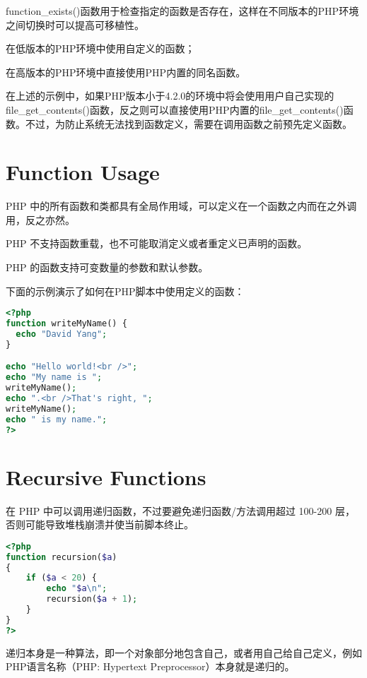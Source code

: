 function\_exists()函数用于检查指定的函数是否存在，这样在不同版本的PHP环境之间切换时可以提高可移植性。

\begin{compactitem}
\item 在低版本的PHP环境中使用自定义的函数；
\item 在高版本的PHP环境中直接使用PHP内置的同名函数。
\end{compactitem}

在上述的示例中，如果PHP版本小于4.2.0的环境中将会使用用户自己实现的file\_get\_contents()函数，反之则可以直接使用PHP内置的file\_get\_contents()函数。不过，为防止系统无法找到函数定义，需要在调用函数之前预先定义函数。






\section{Function Usage}

PHP 中的所有函数和类都具有全局作用域，可以定义在一个函数之内而在之外调用，反之亦然。

PHP 不支持函数重载，也不可能取消定义或者重定义已声明的函数。

PHP 的函数支持可变数量的参数和默认参数。


下面的示例演示了如何在PHP脚本中使用定义的函数：


\begin{lstlisting}[language=PHP]
<?php
function writeMyName() {
  echo "David Yang";
}

echo "Hello world!<br />";
echo "My name is ";
writeMyName();
echo ".<br />That's right, ";
writeMyName();
echo " is my name.";
?>
\end{lstlisting}

\section{Recursive Functions}


在 PHP 中可以调用递归函数，不过要避免递归函数/方法调用超过 100-200 层，否则可能导致堆栈崩溃并使当前脚本终止。

\begin{lstlisting}[language=PHP]
<?php
function recursion($a)
{
    if ($a < 20) {
        echo "$a\n";
        recursion($a + 1);
    }
}
?>
\end{lstlisting}

递归本身是一种算法，即一个对象部分地包含自己，或者用自己给自己定义，例如PHP语言名称（PHP: Hypertext Preprocessor）本身就是递归的。

